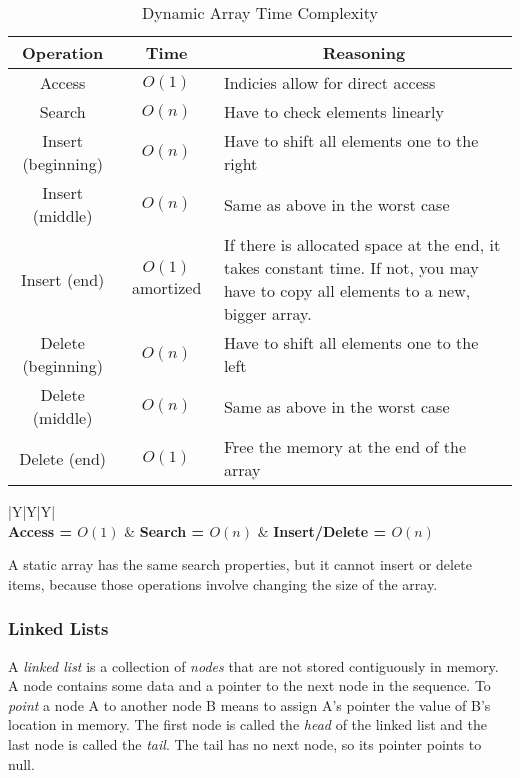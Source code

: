 \begin{table}[H]
	\caption{Dynamic Array Time Complexity}
	\label{tab:array}
	\begin{tabularx}{\textwidth}{|c|c|X|}
		\vtabularspace{3}
		\hline
		Operation & Time & \multicolumn{1}{c|}{Reasoning} \\
		\hline
		Access & $O(1)$ & Indicies allow for direct access \\
		Search & $O(n)$ & Have to check elements linearly \\
		\hline
		\hline
		Insert (beginning) & $O(n)$ & Have to shift all elements one to the right \\
		Insert (middle) & $O(n)$ & Same as above in the worst case \\
		Insert (end) & $O(1)$ amortized & If there is allocated space at the end, it takes constant time. If not, you may have to copy all elements to a new, bigger array.\\
		\hline
		\hline
		Delete (beginning) & $O(n)$ & Have to shift all elements one to the left \\
		Delete (middle) & $O(n)$ & Same as above in the worst case \\
		Delete (end) & $O(1)$ & Free the memory at the end of the array \\
		\hline
	\end{tabularx}
	\begin{tabularx}{\textwidth}{|Y|Y|Y|}
	\hline
	 \\
	\hline
	\textbf{Access = $O(1)$} & \textbf{Search = $O(n)$} & \textbf{Insert/Delete = $O(n)$} \\
	\hline
	\end{tabularx}
\end{table}

A static array has the same search properties, but it cannot insert or delete items, because those operations involve changing the size of the array.

\subsubsection{Linked Lists}


A \textit{linked list} is a collection of \textit{nodes} that are not stored contiguously in memory. A node contains some data and a pointer to the next node in the sequence. To \textit{point} a node A to another node B means to assign A's pointer the value of B's location in memory. The first node is called the \textit{head} of the linked list and the last node is called the \textit{tail}. The tail has no next node, so its pointer points to null.\\


